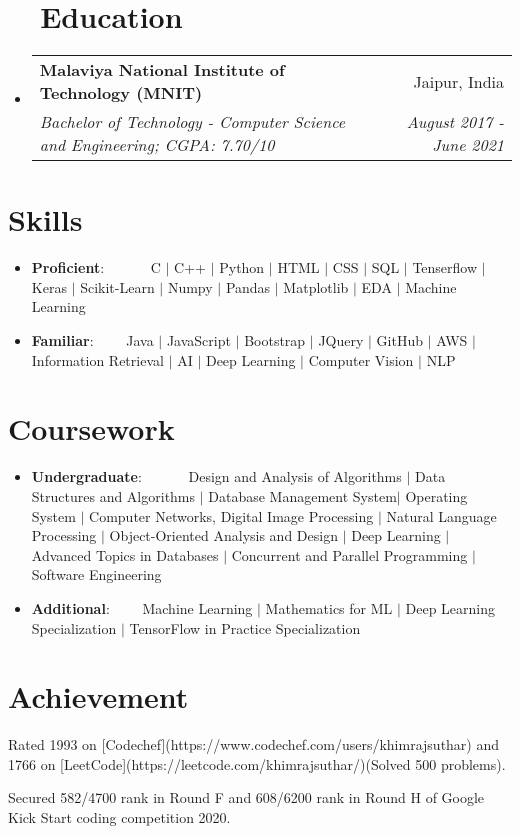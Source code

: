 \documentclass[a4paper,20pt]{article}
\makeatletter
\newcommand{\resumeItem}[2]{
  \item\small{
    \textbf{#1}{: #2 \vspace{-2pt}}
  }
}
\newcommand{\resumeSubheading}[4]{
  \vspace{-1pt}\item
    \begin{tabular*}{0.97\textwidth}{l@{\extracolsep{\fill}}r}
      \textbf{#1} & #2 \\
      \textit{#3} & \textit{#4} \\
    \end{tabular*}\vspace{-5pt}
}
\newcommand{\resumeSubItem}[2]{\resumeItem{#1}{#2}\vspace{-3pt}}
\newcommand{\resumeSubHeadingListStart}{\begin{itemize}[leftmargin=*]}
\newcommand{\resumeSubHeadingListEnd}{\end{itemize}}
\makeatother
\begin{document}
\section{~~Education}
  \resumeSubHeadingListStart
    \resumeSubheading
      {Malaviya National Institute of Technology (MNIT)}{Jaipur, India}
      {Bachelor of Technology - Computer Science and Engineering;  CGPA: 7.70/10}{August 2017 - June 2021}
    \resumeSubHeadingListEnd

\vspace{-3pt}
\section{Skills}
	\resumeSubHeadingListStart
	\resumeSubItem{Proficient}{~~~~~~C $|$ C++ $|$ Python $|$ HTML $|$ CSS $|$ SQL $|$ Tenserﬂow $|$ Keras $|$ Scikit-Learn $|$ Numpy $|$ Pandas $|$ Matplotlib $|$ EDA $|$ Machine Learning}
	\resumeSubItem{Familiar}{~~~~Java $|$ JavaScript $|$ Bootstrap $|$ JQuery $|$ GitHub $|$ AWS $|$ Information Retrieval $|$ AI $|$ Deep Learning $|$ Computer Vision $|$ NLP}
	\resumeSubHeadingListEnd

\vspace{-3pt}
\section{Coursework}
	\resumeSubHeadingListStart
	\resumeSubItem{Undergraduate}{~~~~~~Design and Analysis of Algorithms $|$ Data Structures and Algorithms $|$ Database Management System$|$ Operating System $|$ Computer Networks, Digital Image Processing $|$ Natural Language Processing $|$ Object-Oriented Analysis and Design $|$ Deep Learning $|$ Advanced Topics in Databases $|$ Concurrent and Parallel Programming $|$ Software Engineering}
	\resumeSubItem{Additional}{~~~~Machine Learning $|$ Mathematics for ML $|$ Deep Learning Specialization $|$ TensorFlow in Practice Specialization}
	\resumeSubHeadingListEnd

\vspace{-3pt}
\section{Achievement}
\begin{description}[font=$\bullet$]
\item {Rated 1993 on [Codechef](https://www.codechef.com/users/khimrajsuthar) and 1766 on [LeetCode](https://leetcode.com/khimrajsuthar/)(Solved 500 problems).}
\vspace{-5pt}
\item {Secured 582/4700 rank in Round F and 608/6200 rank in Round H of Google Kick Start coding competition 2020.}

\end{description}
\end{document}
